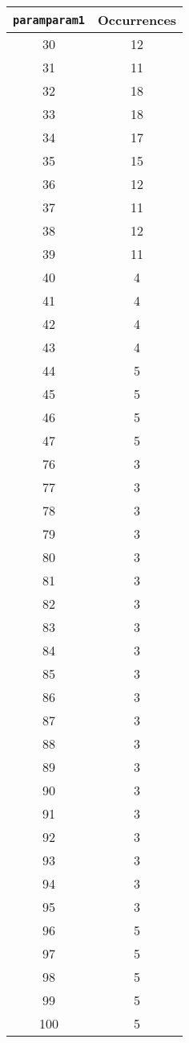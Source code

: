 \documentclass[letterpaper, 12pt]{article}
\begin{document}
\begin{longtable}{|c|c|}
\hline
\textbf{\texttt{paramparam1}} & \textbf{Occurrences} \\
\hline
30 & 12 \\
\hline
31 & 11 \\
\hline
32 & 18 \\
\hline
33 & 18 \\
\hline
34 & 17 \\
\hline
35 & 15 \\
\hline
36 & 12 \\
\hline
37 & 11 \\
\hline
38 & 12 \\
\hline
39 & 11 \\
\hline
40 & 4 \\
\hline
41 & 4 \\
\hline
42 & 4 \\
\hline
43 & 4 \\
\hline
44 & 5 \\
\hline
45 & 5 \\
\hline
46 & 5 \\
\hline
47 & 5 \\
\hline
76 & 3 \\
\hline
77 & 3 \\
\hline
78 & 3 \\
\hline
79 & 3 \\
\hline
80 & 3 \\
\hline
81 & 3 \\
\hline
82 & 3 \\
\hline
83 & 3 \\
\hline
84 & 3 \\
\hline
85 & 3 \\
\hline
86 & 3 \\
\hline
87 & 3 \\
\hline
88 & 3 \\
\hline
89 & 3 \\
\hline
90 & 3 \\
\hline
91 & 3 \\
\hline
92 & 3 \\
\hline
93 & 3 \\
\hline
94 & 3 \\
\hline
95 & 3 \\
\hline
96 & 5 \\
\hline
97 & 5 \\
\hline
98 & 5 \\
\hline
99 & 5 \\
\hline
100 & 5 \\

\end{longtable}
\end{document}
